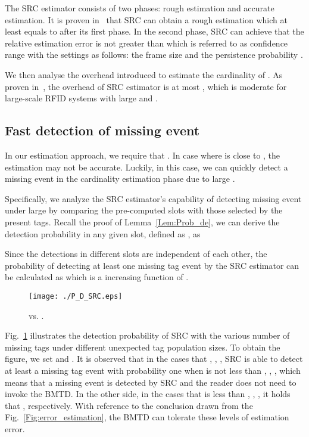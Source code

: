 \documentclass[10pt, twocolumn]{IEEEtran}
\begin{document}
The SRC estimator consists of two phases: rough estimation and accurate estimation. It is proven in~\cite{chen2013understanding} that SRC can obtain a rough estimation  which at least equals to  after its first phase. In the second phase, SRC can achieve that the relative estimation error is not greater than  which is referred to as confidence range with the settings as follows: the frame size  and the persistence probability .

We then analyse the overhead introduced to estimate the cardinality of . As proven in~\cite{chen2013understanding}, the overhead of SRC estimator is at most , which is moderate for large-scale RFID systems with large  and .

\subsection{Fast detection of missing event}

In our estimation approach, we require that . In case where  is close to , the estimation may not be accurate. Luckily, in this case, we can quickly detect a missing event in the cardinality estimation phase due to large .

Specifically, we analyze the SRC estimator's capability of detecting missing event under large  by comparing the pre-computed slots with those selected by the present tags. Recall the proof of Lemma~\ref{Lem:Prob_de}, we can derive the detection probability in any given slot, defined as , as

Since the detections in different slots are independent of each other, the probability of detecting at least one missing tag event by the SRC estimator can be calculated as  which is a increasing function of .

\begin{figure}[htbp]
\centering
\texttt{[image: ./P\_D\_SRC.eps]}
\caption{ vs. .}
\label{Fig:SRC}
\end{figure}

Fig.~\ref{Fig:SRC} illustrates the detection probability of SRC with the various number of missing tags under different unexpected tag population sizes. To obtain the figure, we set  and . It is observed that in the cases that , , , SRC is able to detect at least a missing tag event with probability one when  is not less than , , , which means that a missing event is detected by SRC and the reader does not need to invoke the BMTD. In the other side, in the cases that  is less than , , , it holds that  , respectively. With reference to the conclusion drawn from the Fig.~\ref{Fig:error_estimation}, the BMTD can tolerate these levels of estimation error.
\end{document}
